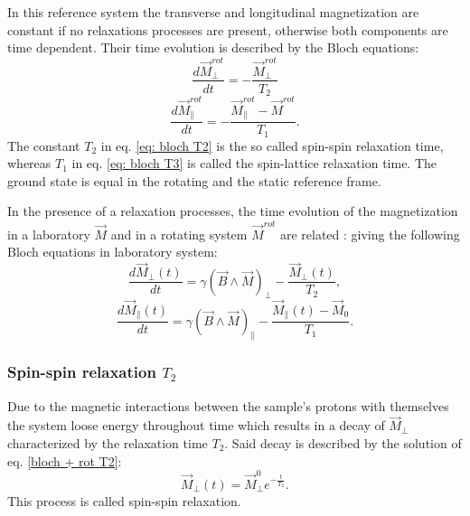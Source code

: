 In this reference system the transverse and longitudinal magnetization are constant if no relaxations processes are present, otherwise both components are time dependent. Their time evolution is described by the Bloch equations:
\begin{equation}
\label{eq: bloch T2}
\frac{d\vec{M}_\perp^{rot}}{dt} = -\frac{\vec{M}_\perp^{rot}}{T_2}
\end{equation}
\begin{equation}
\label{eq: bloch T3}
\frac{d\vec{M}_\parallel^{rot}}{dt} = -\frac{\vec{M}_\parallel^{rot} - \vec{M}^{rot}}{T_1}.
\end{equation}
The constant $T_2$ in eq. \ref{eq: bloch T2} is the so called spin-spin relaxation time, whereas $T_1$ in eq. \ref{eq: bloch T3} is called the spin-lattice relaxation time. The ground state is equal in the rotating and the static reference frame. 

In the presence of a relaxation processes, the time evolution of the magnetization in a laboratory $\vec{M}$ and in a rotating system $\vec{M}^{rot}$ are related :
 giving the following Bloch equations in laboratory system:
 \begin{equation}
 \label{bloch + rot T2}
   \frac{d \vec{M}_{\perp}(t)}{dt} = \gamma(\vec{B}\wedge\vec{M})_\perp - \frac{\vec{M}_\perp (t)}{T_2},
  \end{equation} 
  \begin{equation}
  \label{bloch + rot T1}
     \frac{d \vec{M}_{\parallel}(t)}{dt} = \gamma(\vec{B}\wedge\vec{M})_\parallel  -\frac{\vec{M}_\parallel (t)-\vec{M}_0}{T_1}.
  \end{equation}
 \subsubsection{Spin-spin relaxation $T_2$}
Due to the magnetic interactions between the sample's protons with themselves the system loose energy throughout time which results in a decay of $\vec{M}_\perp$ characterized by the relaxation time $T_2$. Said decay is described by the solution of eq. \ref{bloch + rot T2}:
\begin{equation}
\label{eq: sol. bloch T2}
\vec{M}_{\perp}(t)= \vec{M}_\perp^{0}e^{-\frac{t}{T_2}}.
\end{equation}
This process is called spin-spin relaxation. 


